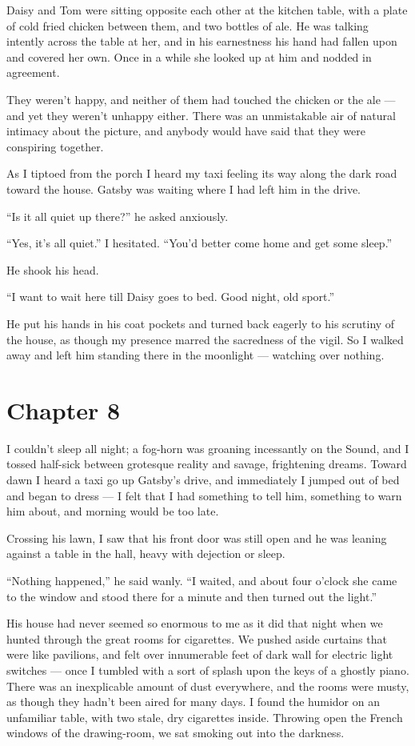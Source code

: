 \documentclass{znotebook}
\begin{document}
Daisy and Tom were sitting opposite each other at the kitchen table, with a plate of cold fried chicken between them, and two bottles of ale. He was talking intently across the table at her, and in his earnestness his hand had fallen upon and covered her own. Once in a while she looked up at him and nodded in agreement.

They weren’t happy, and neither of them had touched the chicken or the ale — and yet they weren’t unhappy either. There was an unmistakable air of natural intimacy about the picture, and anybody would have said that they were conspiring together.

As I tiptoed from the porch I heard my taxi feeling its way along the dark road toward the house. Gatsby was waiting where I had left him in the drive.

``Is it all quiet up there?'' he asked anxiously.

``Yes, it’s all quiet.'' I hesitated. ``You’d better come home and get some sleep.''

He shook his head.

``I want to wait here till Daisy goes to bed. Good night, old sport.''

He put his hands in his coat pockets and turned back eagerly to his scrutiny of the house, as though my presence marred the sacredness of the vigil. So I walked away and left him standing there in the moonlight — watching over nothing.

\chapter{Chapter 8}

I couldn’t sleep all night; a fog-horn was groaning incessantly on the Sound, and I tossed half-sick between grotesque reality and savage, frightening dreams. Toward dawn I heard a taxi go up Gatsby’s drive, and immediately I jumped out of bed and began to dress — I felt that I had something to tell him, something to warn him about, and morning would be too late.

Crossing his lawn, I saw that his front door was still open and he was leaning against a table in the hall, heavy with dejection or sleep.

``Nothing happened,'' he said wanly. ``I waited, and about four o’clock she came to the window and stood there for a minute and then turned out the light.''

His house had never seemed so enormous to me as it did that night when we hunted through the great rooms for cigarettes. We pushed aside curtains that were like pavilions, and felt over innumerable feet of dark wall for electric light switches — once I tumbled with a sort of splash upon the keys of a ghostly piano. There was an inexplicable amount of dust everywhere, and the rooms were musty, as though they hadn’t been aired for many days. I found the humidor on an unfamiliar table, with two stale, dry cigarettes inside. Throwing open the French windows of the drawing-room, we sat smoking out into the darkness.
\end{document}
